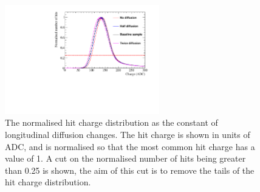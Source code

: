 \begin{figure}[h!]
  \centering
  \includegraphics[width=0.6\textwidth]{Canvas_ChargeCut_Diffusion}
  \caption[The normalised hit charge distribution as the constant of longitudinal diffusion changes]
          {The normalised hit charge distribution as the constant of longitudinal diffusion changes. The hit charge is shown in units of ADC, and is normalised so that the most common hit charge has a value of 1. A cut on the normalised number of hits being greater than 0.25 is shown, the aim of this cut is to remove the tails of the hit charge distribution.}
  \label{fig:DiffNoiseStudy_ChargeCut}
\end{figure}
